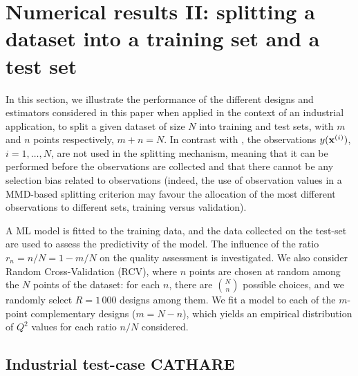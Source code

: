 \section{Numerical results II: splitting a dataset into a training set and a test set}


In this section, we illustrate the performance of the different designs and estimators considered in this paper when applied in the context of an industrial application, to split a given dataset of size $N$ into training  and test sets, with $m$ and $n$ points respectively, $m+n=N$. In contrast with \cite{josvak21}, the observations $y({\bf x}^{(i)})$, $i=1,\ldots,N$, are not used in the splitting mechanism, meaning that it can be performed before the observations are collected and that there cannot be any selection bias related to observations
(indeed, the use of observation values in a MMD-based splitting criterion may favour the allocation of the most different observations to different sets, training versus validation).

A ML model is fitted to the training data, and the data collected on the test-set are used to assess the predictivity of the model. The influence of the ratio $r_n=n/N=1-m/N$ on the quality assessment is investigated. We also consider Random Cross-Validation (RCV), where $n$ points are chosen at random among the $N$ points of the dataset: for each $n$, there are $N \choose n$ possible choices, and we randomly select $R=1\,000$ designs among them.
We fit a model to each of the $m$-point complementary designs ($m=N-n$), which yields an empirical distribution of $Q^2$ values for each ratio $n/N$ considered. 

\subsection{Industrial test-case CATHARE}

